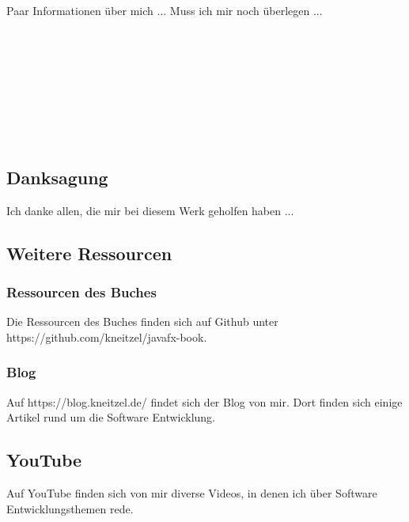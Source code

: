 Paar Informationen über mich ... Muss ich mir noch überlegen ...
\\ \\ \\ \\ \\ \\ \\ \\ \\


\subsection{Danksagung}
Ich danke allen, die mir bei diesem Werk geholfen haben ...

\subsection{Weitere Ressourcen}

\subsubsection{Ressourcen des Buches}
Die Ressourcen des Buches finden sich auf Github unter https://github.com/kneitzel/javafx-book.

\subsubsection{Blog}
Auf https://blog.kneitzel.de/ findet sich der Blog von mir. Dort finden sich einige Artikel rund um die Software Entwicklung.

\subsection{YouTube}
Auf YouTube finden sich von mir diverse Videos, in denen ich über Software Entwicklungsthemen rede.


